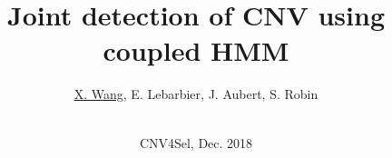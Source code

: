 \documentclass[9pt]{beamer}
\begin{document}

\title[Joint detection of CNV using coupled HMM]{Joint detection of CNV using coupled HMM}

\author[S. Robin]{\underline{X. Wang}, E. Lebarbier, J. Aubert, S. Robin \\ ~\\}


\date[Dec. 2018, CNV4Sel]{CNV4Sel, Dec. 2018}

\maketitle


\end{document}
